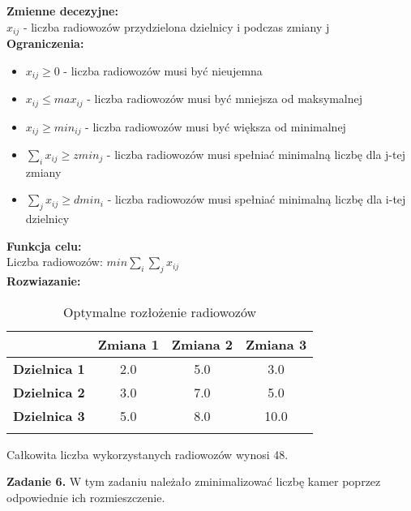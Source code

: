 \documentclass[15pt, a4paper]{article}
\begin{document}
\noindent\textbf{Zmienne decezyjne:}\\

\(x_{ij}\) - liczba radiowozów przydzielona dzielnicy i podczas zmiany j\\

\noindent\textbf{Ograniczenia:}

\begin{itemize}
    \item \(x_{ij} \geq 0 \) - liczba radiowozów musi być nieujemna
    \item \( x_{ij} \leq max_{ij} \) - liczba radiowozów musi być mniejsza od maksymalnej
    \item \( x_{ij} \geq min_{ij} \) - liczba radiowozów musi być większa od minimalnej
    \item \(\sum_{i}x_{ij} \geq zmin_j \) - liczba radiowozów musi spełniać minimalną liczbę dla j-tej zmiany
    \item \(\sum_{j}x_{ij} \geq dmin_i \) - liczba radiowozów musi spełniać minimalną liczbę dla i-tej dzielnicy
\end{itemize}

\noindent\textbf{Funkcja celu:}\\

Liczba radiowozów: \(min \sum_{i}\sum_{j}x_{ij} \)\\

\noindent\textbf{Rozwiazanie:}\\ 

\begin{longtable}{|c|c|c|c|}
    \hline
    & \textbf{Zmiana 1} & \textbf{Zmiana 2} & \textbf{Zmiana 3} \\ 
    \hline
    \textbf{Dzielnica 1} & 2.0 & 5.0 & 3.0 \\ 
    \hline
    \textbf{Dzielnica 2} & 3.0 & 7.0 & 5.0 \\ 
    \hline
    \textbf{Dzielnica 3} & 5.0 & 8.0 & 10.0 \\ 
    \hline
\caption{Optymalne rozłożenie radiowozów}
\end{longtable}

Całkowita liczba wykorzystanych radiowozów wynosi 48.

\vspace{0.5cm}

\noindent\hrulefill

\vspace{0.5cm}


\noindent\textbf{Zadanie 6.} W tym zadaniu należało zminimalizować liczbę kamer poprzez odpowiednie ich rozmieszczenie.\\
\end{document}
